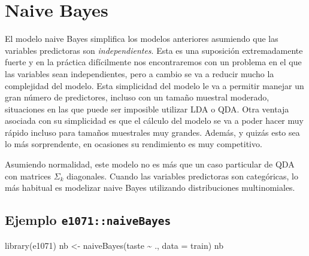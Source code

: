 \documentclass[
  spanish,
]{book}
\newenvironment{Shaded}{\begin{snugshade}}{\end{snugshade}}
\newcommand{\AttributeTok}[1]{\textcolor[rgb]{0.77,0.63,0.00}{#1}}
\newcommand{\FunctionTok}[1]{\textcolor[rgb]{0.00,0.00,0.00}{#1}}
\newcommand{\NormalTok}[1]{#1}
\newcommand{\OtherTok}[1]{\textcolor[rgb]{0.56,0.35,0.01}{#1}}
\newcommand{\SpecialCharTok}[1]{\textcolor[rgb]{0.00,0.00,0.00}{#1}}
\theoremstyle{break}
\theoremstyle{definition}
\theoremstyle{definition}
\theoremstyle{definition}
\theoremstyle{definition}
\theoremstyle{remark}
\begin{document}
\begin{Shaded}
\end{Shaded}

\hypertarget{naive-bayes}{%
\section{Naive Bayes}\label{naive-bayes}}

El modelo naive Bayes simplifica los modelos anteriores asumiendo que las variables predictoras son \emph{independientes}. Esta es una suposición extremadamente fuerte y en la práctica difícilmente nos encontraremos con un problema en el que las variables sean independientes, pero a cambio se va a reducir mucho la complejidad del modelo. Esta simplicidad del modelo le va a permitir manejar un gran número de predictores, incluso con un tamaño muestral moderado, situaciones en las que puede ser imposible utilizar LDA o QDA. Otra ventaja asociada con su simplicidad es que el cálculo del modelo se va a poder hacer muy rápido incluso para tamaños muestrales muy grandes. Además, y quizás esto sea lo más sorprendente, en ocasiones su rendimiento es muy competitivo.

Asumiendo normalidad, este modelo no es más que un caso particular de QDA con matrices \(\Sigma_k\) diagonales. Cuando las variables predictoras son categóricas, lo más habitual es modelizar naive Bayes utilizando distribuciones multinomiales.

\hypertarget{ejemplo-e1071naivebayes}{%
\subsection{\texorpdfstring{Ejemplo \texttt{e1071::naiveBayes}}{Ejemplo e1071::naiveBayes}}\label{ejemplo-e1071naivebayes}}

\begin{Shaded}
\begin{Highlighting}[]
\FunctionTok{library}\NormalTok{(e1071)}
\NormalTok{nb }\OtherTok{\textless{}{-}} \FunctionTok{naiveBayes}\NormalTok{(taste }\SpecialCharTok{\textasciitilde{}}\NormalTok{ ., }\AttributeTok{data =}\NormalTok{ train)}
\NormalTok{nb}
\end{Highlighting}
\end{Shaded}
\end{document}
